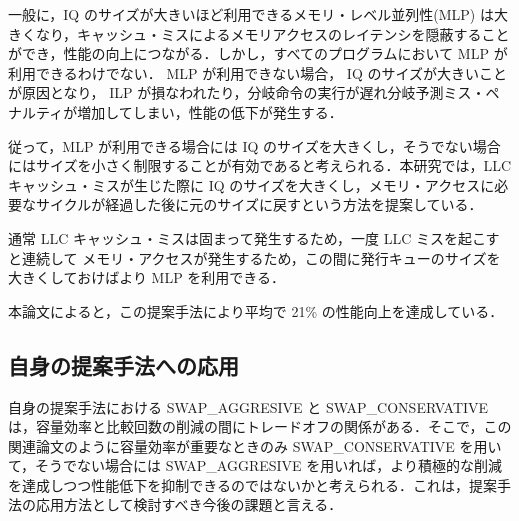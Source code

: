 \documentclass[twocolumn]{jsarticle}
\begin{document}
一般に，IQ のサイズが大きいほど利用できるメモリ・レベル並列性(MLP) は大きくなり，キャッシュ・ミスによるメモリアクセスのレイテンシを隠蔽することができ，性能の向上につながる．しかし，すべてのプログラムにおいて MLP が利用できるわけでない． MLP が利用できない場合， IQ のサイズが大きいことが原因となり， ILP が損なわれたり，分岐命令の実行が遅れ分岐予測ミス・ペナルティが増加してしまい，性能の低下が発生する．

従って，MLP が利用できる場合には IQ のサイズを大きくし，そうでない場合にはサイズを小さく制限することが有効であると考えられる．本研究では，LLC キャッシュ・ミスが生じた際に IQ のサイズを大きくし，メモリ・アクセスに必要なサイクルが経過した後に元のサイズに戻すという方法を提案している．

通常 LLC キャッシュ・ミスは固まって発生するため，一度 LLC ミスを起こすと連続して メモリ・アクセスが発生するため，この間に発行キューのサイズを大きくしておけばより MLP を利用できる．

本論文によると，この提案手法により平均で 21\% の性能向上を達成している．

\subsection{自身の提案手法への応用}
自身の提案手法における SWAP\_AGGRESIVE と SWAP\_CONSERVATIVE は，容量効率と比較回数の削減の間にトレードオフの関係がある．そこで，この関連論文のように容量効率が重要なときのみ SWAP\_CONSERVATIVE を用いて，そうでない場合には SWAP\_AGGRESIVE を用いれば，より積極的な削減を達成しつつ性能低下を抑制できるのではないかと考えられる．これは，提案手法の応用方法として検討すべき今後の課題と言える．
  
  
   
  
  
  
\end{document}
